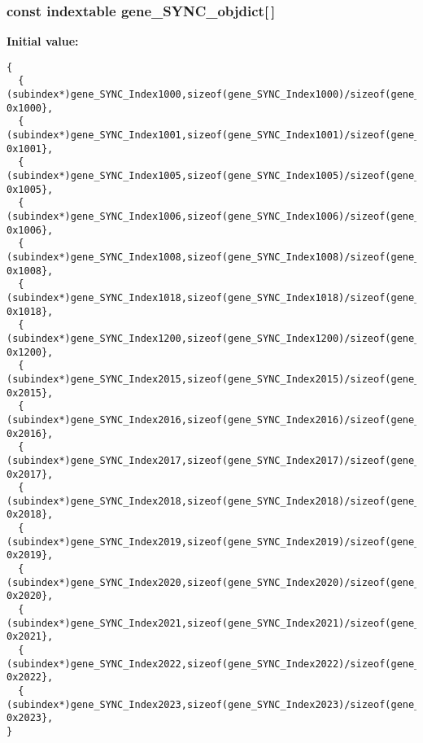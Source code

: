 \subsubsection{\setlength{\rightskip}{0pt plus 5cm}const {\bf indextable} {\bf gene\_\-SYNC\_\-objdict}[$\,$]}\label{objdict_8c_79def2423fd469765bd3431093d15816}


\textbf{Initial value:}

\begin{Code}\begin{verbatim} 
{
  { (subindex*)gene_SYNC_Index1000,sizeof(gene_SYNC_Index1000)/sizeof(gene_SYNC_Index1000[0]), 0x1000},
  { (subindex*)gene_SYNC_Index1001,sizeof(gene_SYNC_Index1001)/sizeof(gene_SYNC_Index1001[0]), 0x1001},
  { (subindex*)gene_SYNC_Index1005,sizeof(gene_SYNC_Index1005)/sizeof(gene_SYNC_Index1005[0]), 0x1005},
  { (subindex*)gene_SYNC_Index1006,sizeof(gene_SYNC_Index1006)/sizeof(gene_SYNC_Index1006[0]), 0x1006},
  { (subindex*)gene_SYNC_Index1008,sizeof(gene_SYNC_Index1008)/sizeof(gene_SYNC_Index1008[0]), 0x1008},
  { (subindex*)gene_SYNC_Index1018,sizeof(gene_SYNC_Index1018)/sizeof(gene_SYNC_Index1018[0]), 0x1018},
  { (subindex*)gene_SYNC_Index1200,sizeof(gene_SYNC_Index1200)/sizeof(gene_SYNC_Index1200[0]), 0x1200},
  { (subindex*)gene_SYNC_Index2015,sizeof(gene_SYNC_Index2015)/sizeof(gene_SYNC_Index2015[0]), 0x2015},
  { (subindex*)gene_SYNC_Index2016,sizeof(gene_SYNC_Index2016)/sizeof(gene_SYNC_Index2016[0]), 0x2016},
  { (subindex*)gene_SYNC_Index2017,sizeof(gene_SYNC_Index2017)/sizeof(gene_SYNC_Index2017[0]), 0x2017},
  { (subindex*)gene_SYNC_Index2018,sizeof(gene_SYNC_Index2018)/sizeof(gene_SYNC_Index2018[0]), 0x2018},
  { (subindex*)gene_SYNC_Index2019,sizeof(gene_SYNC_Index2019)/sizeof(gene_SYNC_Index2019[0]), 0x2019},
  { (subindex*)gene_SYNC_Index2020,sizeof(gene_SYNC_Index2020)/sizeof(gene_SYNC_Index2020[0]), 0x2020},
  { (subindex*)gene_SYNC_Index2021,sizeof(gene_SYNC_Index2021)/sizeof(gene_SYNC_Index2021[0]), 0x2021},
  { (subindex*)gene_SYNC_Index2022,sizeof(gene_SYNC_Index2022)/sizeof(gene_SYNC_Index2022[0]), 0x2022},
  { (subindex*)gene_SYNC_Index2023,sizeof(gene_SYNC_Index2023)/sizeof(gene_SYNC_Index2023[0]), 0x2023},
}
\end{verbatim}\end{Code}

